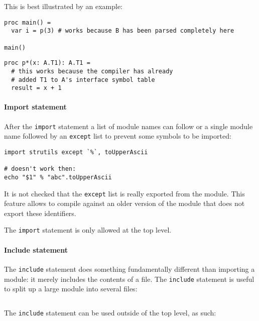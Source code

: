 This is best illustrated by an example:

\begin{verbatim}
proc main() =
  var i = p(3) # works because B has been parsed completely here

main()
\end{verbatim}

\begin{verbatim}
proc p*(x: A.T1): A.T1 =
  # this works because the compiler has already
  # added T1 to A's interface symbol table
  result = x + 1
\end{verbatim}

\hypertarget{import-statement}{%
\paragraph{Import statement}\label{import-statement}}

After the \texttt{import} statement a list of module names can follow or
a single module name followed by an \texttt{except} list to prevent some
symbols to be imported:

\begin{verbatim}
import strutils except `%`, toUpperAscii

# doesn't work then:
echo "$1" % "abc".toUpperAscii
\end{verbatim}

It is not checked that the \texttt{except} list is really exported from
the module. This feature allows to compile against an older version of
the module that does not export these identifiers.

The \texttt{import} statement is only allowed at the top level.

\hypertarget{include-statement}{%
\paragraph{Include statement}\label{include-statement}}

The \texttt{include} statement does something fundamentally different
than importing a module: it merely includes the contents of a file. The
\texttt{include} statement is useful to split up a large module into
several files:

\begin{verbatim}
\end{verbatim}

The \texttt{include} statement can be used outside of the top level, as
such:

